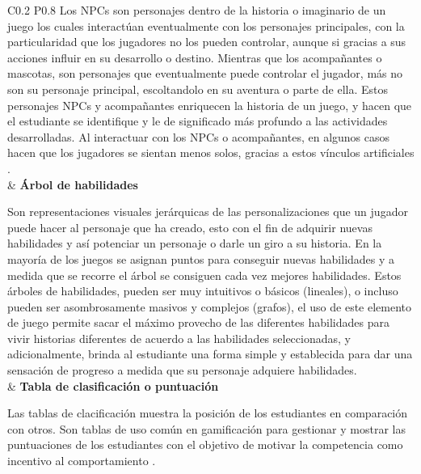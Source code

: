 \begin{longtable}{C{0.2\linewidth} P{0.8\linewidth}}
Los NPCs son personajes dentro de la historia o imaginario de un juego los cuales interactúan eventualmente
con los personajes principales, con la particularidad que los jugadores  no los pueden controlar, aunque si
gracias a sus acciones influir en su desarrollo o destino. Mientras que los acompañantes o mascotas, son 
personajes que eventualmente puede controlar el jugador, más no son su personaje principal, escoltandolo en su 
aventura o parte de ella. Estos personajes NPCs y acompañantes enriquecen la historia de un juego, y hacen que 
el estudiante se identifique y le de significado más profundo a las actividades desarrolladas. Al interactuar 
con los NPCs o acompañantes, en algunos casos hacen que los jugadores se sientan menos solos, gracias a estos 
vínculos artificiales \cite{13034670820180801}.
\\
& \textbf{Árbol de habilidades}

Son representaciones visuales jerárquicas de las personalizaciones que un jugador puede hacer al personaje que
ha creado, esto con el fin de adquirir nuevas habilidades y así potenciar un personaje o darle un giro a su
historia. En la mayoría de los juegos se asignan puntos para conseguir nuevas habilidades y a medida que se
recorre el árbol se consiguen cada vez mejores habilidades. Estos árboles de habilidades, pueden ser muy 
intuitivos o básicos (lineales), o incluso pueden ser asombrosamente masivos y complejos (grafos), el uso de
este elemento de juego permite sacar el máximo provecho de las diferentes habilidades para vivir historias 
diferentes de acuerdo a las habilidades seleccionadas, y adicionalmente, brinda al estudiante una forma simple 
y establecida para dar una sensación de progreso a medida que su personaje adquiere habilidades.
\\
 & \textbf{Tabla de clasificación o puntuación}

Las tablas de clacificación muestra la posición de los estudiantes en comparación con otros. Son tablas de uso
común en gamificación para gestionar y mostrar las puntuaciones de los estudiantes con el objetivo de motivar 
la competencia como incentivo al comportamiento \cite{DAROCHASEIXAS201648}.


\end{longtable}
